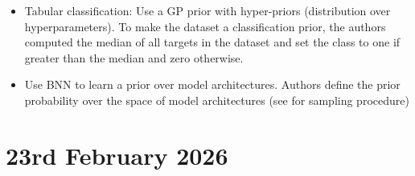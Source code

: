 \documentclass[12pt,a4paper,twoside]{article}
\begin{document}
\begin{paper}
\begin{itemize}
		\begin{itemize}
			\item Tabular classification: Use a GP prior with hyper-priors (distribution over hyperparameters). To make the dataset a classification prior, the authors computed the median of all targets in the dataset and set the class to one if greater than the median and zero otherwise.
			\item Use BNN to learn a prior over model architectures. Authors define the prior probability over the space of model architectures (see \cite{Mller2022} for sampling procedure)
		\end{itemize}
	\end{itemize}
\end{paper}

\section{23rd February 2026}
\end{document}
